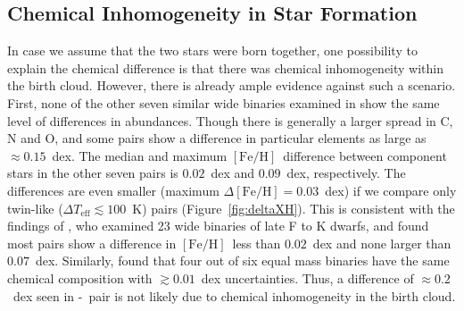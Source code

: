 \documentclass[modern, letterpaper]{aastex61}
\newcommand{\figname}{Figure}
\newcommand*\elem[1]{\ensuremath{\mathrm{#1}}}
\newcommand*\elemH[1]{\ensuremath{[\mathrm{#1}/\elem{H}]}}
\newcommand*{\feh}{\ensuremath{\elemH{Fe}}}
\newcommand{\sunanalog}{\text{Krios}}
\newcommand{\bizarreone}{\text{Kronos}}
\begin{document}

\subsection{Chemical Inhomogeneity in Star Formation}
\label{sub:chemical_inhomogeneity_in_star_formation}

In case we assume that the two stars were born together, one possibility to
explain the chemical difference is that there was chemical inhomogeneity within
the birth cloud.
However, there is already ample evidence against such a scenario.
First, none of the other seven similar wide binaries examined in
\citealt{2016ApJS..225...32B} show the same level of differences in abundances.
Though there is generally a larger spread in $\elem{C}$, $\elem{N}$ and
$\elem{O}$, and some pairs show a difference in particular elements as large as
$\approx 0.15$~dex.
The median and maximum \feh\ difference between component stars in the other
seven pairs is $0.02$~dex and $0.09$~dex, respectively.
The differences are even smaller (maximum $\Delta\feh = 0.03$~dex) if we
compare only twin-like ($\Delta T_\mathrm{eff} \lesssim 100$~K) pairs
(\figname~\ref{fig:deltaXH}).
This is consistent with the findings of \citealt{Desidera:2004aa}, who examined
23 wide binaries of late F to K dwarfs, and found most pairs show a difference
in \feh\ less than $0.02$~dex and none larger than $0.07$~dex.
Similarly, \citealt{Gratton:2001aa} found that four out of six equal mass
binaries have the same chemical composition with $\gtrsim 0.01$~dex
uncertainties.
Thus, a difference of $\approx 0.2$~dex seen in \bizarreone-\sunanalog\ pair is
not likely due to chemical inhomogeneity in the birth cloud.
\end{document}
